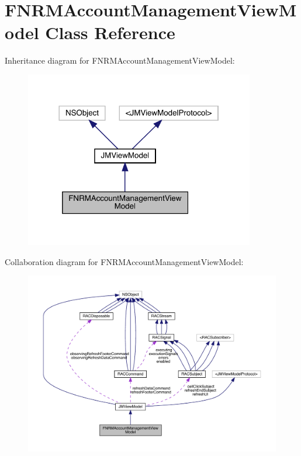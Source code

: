 \hypertarget{interface_f_n_r_m_account_management_view_model}{}\section{F\+N\+R\+M\+Account\+Management\+View\+Model Class Reference}
\label{interface_f_n_r_m_account_management_view_model}


Inheritance diagram for F\+N\+R\+M\+Account\+Management\+View\+Model\+:\nopagebreak
\begin{figure}[H]
\begin{center}
\leavevmode
\includegraphics[width=284pt]{interface_f_n_r_m_account_management_view_model__inherit__graph}
\end{center}
\end{figure}


Collaboration diagram for F\+N\+R\+M\+Account\+Management\+View\+Model\+:\nopagebreak
\begin{figure}[H]
\begin{center}
\leavevmode
\includegraphics[width=350pt]{interface_f_n_r_m_account_management_view_model__coll__graph}
\end{center}
\end{figure}
